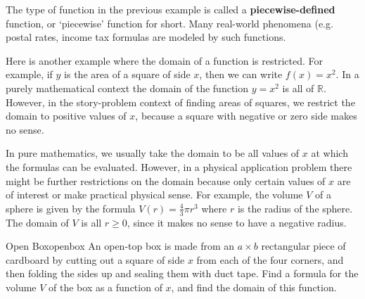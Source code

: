 The type of function in the previous example is called a \textbf{piecewise-defined} function, or `piecewise' function for short.  Many real-world phenomena (e.g. postal rates, income tax formulas are modeled by such functions.  

Here is another example where the domain of a function is restricted. For example, if $y$ is the area of a
square of side $x$, then we can write $f(x)=x^2$.  In a purely
mathematical context the domain of the function $y=x^2$ is all of
$\mathbb{R}$. However, in the story-problem context of finding areas of squares,
we restrict the domain to positive values of $x$, because a square
with negative or zero side makes no sense.

In pure mathematics, we usually take the domain to be all
values of $x$ at which the formulas can be evaluated. However, in
a physical application problem there might be further restrictions on the domain
because only certain values of $x$ are of interest or make practical
physical sense. For example, the volume $V$ of a sphere is given by the formula $V(r)=\frac{4}{3}\pi r^3$ where $r$ is the radius of the sphere. The domain of $V$ is all $r \geq 0$, since it makes no sense to have a negative radius.\\ 


%
%
\begin{example}{Open Box}{openbox} 
An open-top box is made from an $a\times b$ rectangular piece of
cardboard by cutting out a square of side $x$ from each of the four
corners, and then folding the sides up and sealing them with duct
tape.  Find a formula for the volume $V$ of the box as a function of
$x$, and find the domain of this function.
\end{example}

